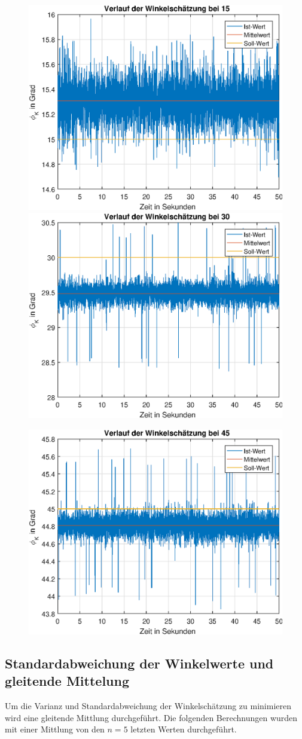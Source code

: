 \documentclass{article}
\begin{document}
\newpage
\begin{figure}[h]
	\includegraphics[width=0.5\linewidth]{img/phiK15_degree.eps}
	\includegraphics[width=0.5\linewidth]{img/phiK30_degree.eps}
\end{figure}
\begin{figure}[h]
	\includegraphics[width=0.5\linewidth]{img/phiK45_degree.eps}
\end{figure}

\newpage
\subsection{Standardabweichung der Winkelwerte und gleitende Mittelung}
Um die Varianz und Standardabweichung der Winkelschätzung zu minimieren wird eine gleitende Mittlung durchgeführt. Die folgenden Berechnungen wurden mit einer Mittlung von den $n = 5$ letzten Werten durchgeführt.
\end{document}
